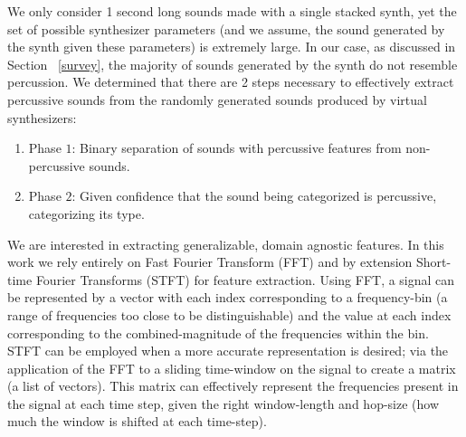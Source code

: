 \documentclass[\main/thesis.tex]{subfiles}
\begin{document}
We only consider 1 second long sounds made with a single stacked synth, yet the set of possible synthesizer parameters (and we assume, the sound generated by the synth given these parameters) is extremely large. In our case, as discussed in Section ~\ref{survey}, the majority of sounds generated by the synth do not resemble percussion.  We determined that there are 2 steps necessary to effectively extract percussive sounds
from the randomly generated sounds produced by virtual synthesizers: 
\begin{enumerate}
   \item  Phase $1$: Binary separation of sounds with percussive features from non-percussive sounds.
   \item Phase $2$: Given confidence that the sound being categorized is percussive, categorizing its type.
\end{enumerate}
We are interested in extracting generalizable, domain agnostic features. In this work we rely entirely on Fast Fourier Transform (FFT) and by extension Short-time Fourier Transforms (STFT) for feature extraction. Using FFT, a signal can be represented by a vector with each index corresponding to a frequency-bin (a range of frequencies too close to be distinguishable) and the value at each index corresponding to the combined-magnitude of the frequencies within the bin. STFT can be employed when a more accurate representation is desired; via the application of the FFT to a sliding time-window on the signal to create a matrix (a list of vectors). This matrix can effectively represent the frequencies present in the signal at each time step, given the right window-length and hop-size (how much the window is shifted at each time-step).
\end{document}
